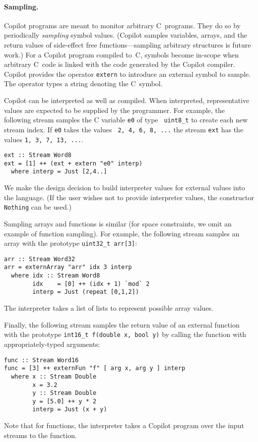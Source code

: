 \paragraph{Sampling.}
Copilot programs are meant to monitor arbitrary C~programs.  They do
so by
periodically \emph{sampling} symbol values. (Copilot samples variables, arrays,
and the return values of side-effect free functions---sampling arbitrary
structures is future work.)  For a Copilot program compiled to~C, symbols become
in-scope when arbitrary C~code is linked with the code generated by the Copilot
compiler.  Copilot provides the operator {\tt extern} to introduce an external
symbol to sample.  The operator types a string denoting the C~symbol.

Copilot can be interpreted as well as compiled.  When interpreted,
representative values are expected to be supplied by the programmer.  For
example, the following stream samples the C variable {\tt e0} of type {\tt
  uint8\_t} to create each new stream index.  If {\tt e0} takes the values {\tt
  2, 4, 6, 8, ...}  the stream {\tt ext} has the values {\tt 1, 3, 7, 13, ...}.
%
\begin{lstlisting}[frame=single]
ext :: Stream Word8
ext = [1] ++ (ext + extern "e0" interp)
  where interp = Just [2,4..]
\end{lstlisting}
%
We make the design decision to build interpreter values for external values
into the language.  (If the user wishes not to provide interpreter values,
the constructor {\tt Nothing} can be used.)

Sampling arrays and functions is similar (for space constraints, we omit an
example of function sampling).  For example, the following stream samples an
array with the prototype {\tt uint32\_t arr[3]}:
%
\begin{lstlisting}[frame=single]
arr :: Stream Word32
arr = externArray "arr" idx 3 interp
  where idx :: Stream Word8
        idx    = [0] ++ (idx + 1) `mod` 2
        interp = Just (repeat [0,1,2])
\end{lstlisting}
The interpreter takes a list of lists to represent possible array values.

Finally, the following stream samples the return value of an external function
with the prototype {\tt int16\_t f(double x, bool y)} by calling the function
with appropriately-typed arguments:
%
\begin{lstlisting}[frame=single]
func :: Stream Word16
func = [3] ++ externFun "f" [ arg x, arg y ] interp
  where x :: Stream Double
        x = 3.2
        y :: Stream Double
        y = [5.0] ++ y * 2
        interp = Just (x + y)
\end{lstlisting}
%
Note that for functions, the interpreter takes a Copilot program over the input
streams to the function.


